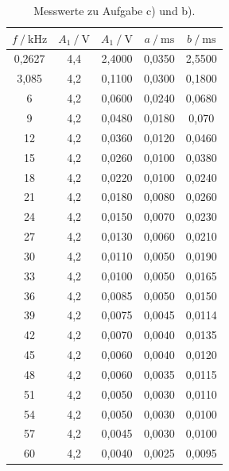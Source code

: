 \begin{table}[H]
    \centering
    \caption{Messwerte zu Aufgabe c) und b).}
    \label{tab:wertebc}
    \begin{tabular}{c c c c c}
        \toprule
        $f \:/\:\si{\kilo\hertz}$ & $A_1 \:/\: \si{\volt}$ & $A_1 \:/\: \si{\volt}$ & $a \:/\: \si{\milli\second}$ & $b \:/\: \si{\milli\second}$ \\
        \midrule
        0,2627 & 4,4 & 2,4000 & 0,0350 & 2,5500 \\
        3,085 & 4,2 & 0,1100 & 0,0300 & 0,1800 \\
        6 & 4,2 & 0,0600 & 0,0240 & 0,0680 \\
        9 & 4,2 & 0,0480 & 0,0180 & 0,070 \\
        12 & 4,2 & 0,0360 & 0,0120 & 0,0460 \\
        15 & 4,2 & 0,0260 & 0,0100 & 0,0380 \\
        18 & 4,2 & 0,0220 & 0,0100 & 0,0240 \\
        21 & 4,2 & 0,0180 & 0,0080 & 0,0260 \\
        24 & 4,2 & 0,0150 & 0,0070 & 0,0230 \\
        27 & 4,2 & 0,0130 & 0,0060 & 0,0210 \\
        30 & 4,2 & 0,0110 & 0,0050 & 0,0190 \\
        33 & 4,2 & 0,0100 & 0,0050 & 0,0165 \\
        36 & 4,2 & 0,0085 & 0,0050 & 0,0150 \\
        39 & 4,2 & 0,0075 & 0,0045 & 0,0114 \\
        42 & 4,2 & 0,0070 & 0,0040 & 0,0135 \\
        45 & 4,2 & 0,0060 & 0,0040 & 0,0120 \\
        48 & 4,2 & 0,0060 & 0,0035 & 0,0115 \\
        51 & 4,2 & 0,0050 & 0,0030 & 0,0110 \\
        54 & 4,2 & 0,0050 & 0,0030 & 0,0100 \\
        57 & 4,2 & 0,0045 & 0,0030 & 0,0100 \\
        60 & 4,2 & 0,0040 & 0,0025 & 0,0095 \\
        \bottomrule
    \end{tabular}
\end{table}


